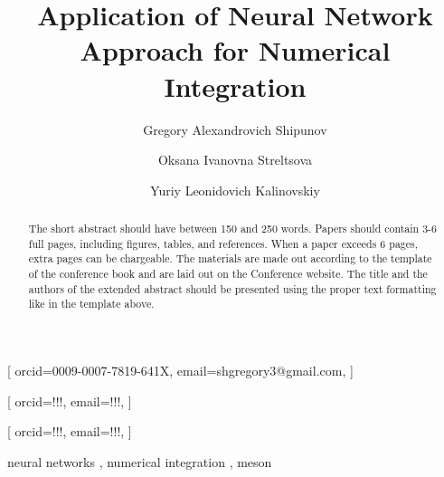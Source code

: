 \documentclass[%
]{ittmm}
\begin{document}


\title{Application of Neural Network Approach for Numerical Integration}


\author[1]{Gregory Alexandrovich Shipunov}[%
orcid=0009-0007-7819-641X,
email=shgregory3@gmail.com,
]
\cormark[1]

\author[2]{Oksana Ivanovna Streltsova}[%
orcid=!!!,
email=!!!,
]

\author[2]{Yuriy Leonidovich Kalinovskiy}[%
orcid=!!!,
email=!!!,
]
\address[1]{Dubna State University,
  19 Universitetskaya St, Dubna, 141980, Russian Federation}
\address[2]{Joint Institute for Nuclear Research,
  6 Joliot-Curie St, Dubna, 141980, Russian Federation}


\begin{abstract}
    The short abstract should have between 150 and 250 words.
    Papers should contain 3-6 full pages, including figures, tables, and references.
    When a paper exceeds 6 pages, extra pages can be chargeable.
    The materials are made out according to the template of the conference book and are laid out on the Conference website.
    The title and the authors of the extended abstract should be presented using the proper text formatting like in the template above.
\end{abstract}

\begin{keywords}
  neural networks \sep
  numerical integration \sep
  meson
\end{keywords}
\end{document}
